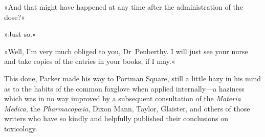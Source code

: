 »And that might have happened at any time after the administration of the dose?«

»Just so.«

»Well, I'm very much obliged to you, Dr~Penberthy. I will just see your nurse and take copies of the entries in your books, if I may.«

This done, Parker made his way to Portman Square, still a little hazy in his mind as to the habits of the common foxglove when applied internally—a haziness which was in no way improved by a subsequent consultation of the \textit{Materia Medica}, the \textit{Pharmacopœia}, Dixon Mann, Taylor, Glaister, and others of those writers who have so kindly and helpfully published their conclusions on toxicology.